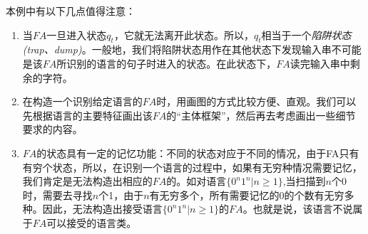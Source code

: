 本例中有以下几点值得注意：
\begin{enumerate} 
	\item 当$FA$一旦进入状态$q_t$，它就无法离开此状态。所以，$q_t$相当于一个\emph{陷阱状态(trap、dump)}。一般地，我们将陷阱状态用作在其他状态下发现输入串不可能是该$FA$所识别的语言的句子时进入的状态。在此状态下，$FA$读完输入串中剩余的字符。 
	\item  在构造一个识别给定语言的$FA$时，用画图的方式比较方便、直观。我们可以先根据语言的主要特征画出该$FA$的“主体框架”，然后再去考虑画出一些细节要求的内容。
	\item $FA$的状态具有一定的记忆功能：不同的状态对应于不同的情况，由于FA只有有穷个状态，所以，在识别一个语言的过程中，如果有无穷种情况需要记忆，我们肯定是无法构造出相应的$FA$的。如对语言$\{0^n1^n|n\ge 1\}$,当扫描到$n$个0时，需要去寻找$n$个1，由于$n$有无穷多个，所有需要记忆的0的个数有无穷多种。因此，无法构造出接受语言$\{0^n1^n|n\ge 1\}$的$FA$。也就是说，该语言不说属于$FA$可以接受的语言类。 	
\end{enumerate}


